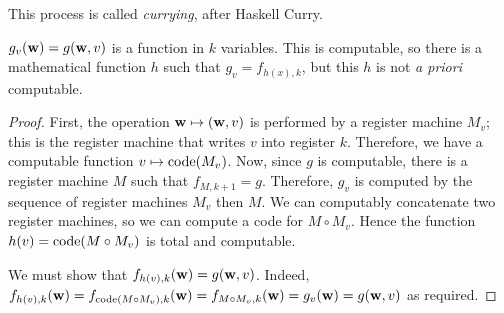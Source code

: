 This process is called \emph{currying}, after Haskell Curry.
\begin{remark}
	\( g_v(\vb w) = g(\vb w, v) \) is a function in \( k \) variables.
	This is computable, so there is a mathematical function \( h \) such that \( g_v = f_{h(x),k} \), but this \( h \) is not \emph{a priori} computable.
\end{remark}
\begin{proof}
	First, the operation \( \vb w \mapsto (\vb w, v) \) is performed by a register machine \( M_v \); this is the register machine that writes \( v \) into register \( k \).
	Therefore, we have a computable function \( v \mapsto \operatorname{code}(M_v) \).
	Now, since \( g \) is computable, there is a register machine \( M \) such that \( f_{M,k+1} = g \).
	Therefore, \( g_v \) is computed by the sequence of register machines \( M_v \) then \( M \).
	We can computably concatenate two register machines, so we can compute a code for \( M \circ M_v \).
	Hence the function \( h(v) = \operatorname{code}(M \circ M_v) \) is total and computable.

	We must show that \( f_{h(v),k}(\vb w) = g(\vb w, v) \).
	Indeed, \( f_{h(v),k}(\vb w) = f_{\operatorname{code}(M \circ M_v), k}(\vb w) = f_{M \circ M_v, k}(\vb w) = g_v(\vb w) = g(\vb w, v) \) as required.
\end{proof}

